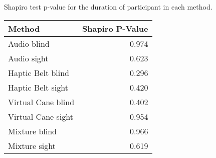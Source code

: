 
\centering
\caption{Shapiro test p-value for the duration of participant in each method.}
\label{tab:shapiro_duration}
\begin{tabular}{lr}
\toprule
            Method &  Shapiro P-Value \\
\midrule
       Audio blind &            0.974 \\
       Audio sight &            0.623 \\
 Haptic Belt blind &            0.296 \\
 Haptic Belt sight &            0.420 \\
Virtual Cane blind &            0.402 \\
Virtual Cane sight &            0.954 \\
     Mixture blind &            0.966 \\
     Mixture sight &            0.619 \\
\bottomrule
\end{tabular}
